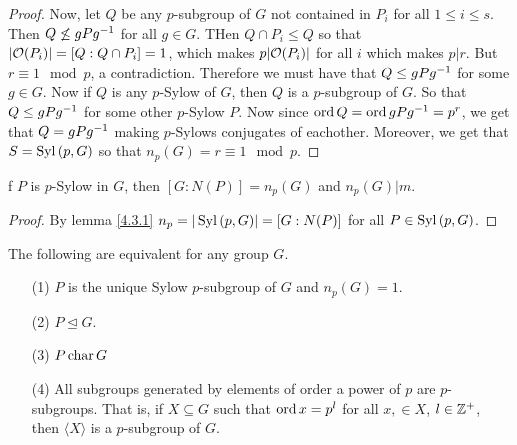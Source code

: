 \begin{proof}
  Now, let $Q$ be any $p$-subgroup of $G$ not contained in  $P_i$ for all  $1
  \leq i \leq s$. Then  $Q \not\leq gPg^{-1}$ for all $g \in G$. THen  $Q
  \cap P_i \leq Q$ so that $|\mathcal{O}(P_i)|=[Q:Q \cap P_i]=1$, which makes
  $p|\mathcal{O}(P_i)|$ for all $i$ which makes  $p|r$. But  $r \equiv 1 \mod{p}$, a
  contradiction. Therefore we must have that $Q \leq gPg^{-1}$ for some $g
  \in G$. Now if $Q$ is any  $p$-Sylow of  $G$, then $Q$ is a $p$-subgroup of
  $G$. So that  $Q \leq gPg^{-1}$ for some other $p$-Sylow $P$. Now since
  $\operatorname{ord}{Q}=\operatorname{ord}{gPg^{-1}}=p^r$, we get that $Q=gPg^{-1}$ making $p$-Sylows
  conjugates of eachother. Moreover, we get that $S=\operatorname{Syl}{(p,G)}$ so that
  $n_p(G)=r \equiv 1 \mod{p}$.
\end{proof}
\begin{corollary}
  f $P$ is $p$-Sylow in $G$, then  $[G:N(P)]=n_p(G)$ and $n_p(G)|m$.
\end{corollary}
\begin{proof}
  By lemma \ref{4.3.1} $n_p=|\operatorname{Syl}{(p,G)}|=[G:N(P)]$ for all $P \in
  \operatorname{Syl}{(p,G)}$.
\end{proof}
\begin{corollary}
  The following are equivalent for any group $G$.
  \begin{enumerate}
    \item[(1)] $P$ is the unique Sylow  $p$-subgroup of  $G$ and
      $n_p(G)=1$.

    \item[(2)] $P \unlhd G$.

    \item[(3)] $P \operatorname{char} G$

    \item[(4)] All subgroups generated by elements of order a power of $p$
      are $p$-subgroups. That is, if $X \subseteq G$ such that
      $\operatorname{ord}{x}=p^l$ for all $x, \in X$,  $l \in \mathbb{Z}^+$, then  $\langle X
      \rangle$ is a $p$-subgroup of  $G$.
  \end{enumerate}
\end{corollary}
